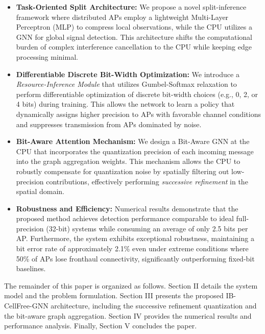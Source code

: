 \begin{itemize}
    \item \textbf{Task-Oriented Split Architecture:} We propose a novel split-inference framework where distributed APs employ a lightweight Multi-Layer Perceptron (MLP) to compress local observations, while the CPU utilizes a GNN for global signal detection. This architecture shifts the computational burden of complex interference cancellation to the CPU while keeping edge processing minimal.
    
    \item \textbf{Differentiable Discrete Bit-Width Optimization:} We introduce a \textit{Resource-Inference Module} that utilizes Gumbel-Softmax relaxation to perform differentiable optimization of discrete bit-width choices (e.g., 0, 2, or 4 bits) during training. This allows the network to learn a policy that dynamically assigns higher precision to APs with favorable channel conditions and suppresses transmission from APs dominated by noise.
    
    \item \textbf{Bit-Aware Attention Mechanism:} We design a Bit-Aware GNN at the CPU that incorporates the quantization precision of each incoming message into the graph aggregation weights. This mechanism allows the CPU to robustly compensate for quantization noise by spatially filtering out low-precision contributions, effectively performing \textit{successive refinement} in the spatial domain.
    
    \item \textbf{Robustness and Efficiency:} Numerical results demonstrate that the proposed method achieves detection performance comparable to ideal full-precision (32-bit) systems while consuming an average of only 2.5 bits per AP. Furthermore, the system exhibits exceptional robustness, maintaining a bit error rate of approximately 2.1\% even under extreme conditions where 50\% of APs lose fronthaul connectivity, significantly outperforming fixed-bit baselines.
\end{itemize}

The remainder of this paper is organized as follows. Section II details the system model and the problem formulation. Section III presents the proposed IB-CellFree-GNN architecture, including the successive refinement quantization and the bit-aware graph aggregation. Section IV provides the numerical results and performance analysis. Finally, Section V concludes the paper.